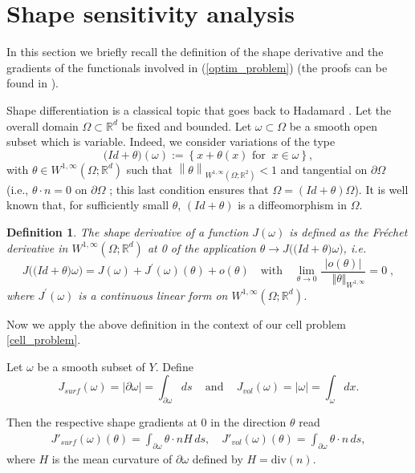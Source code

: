 \documentclass{article}
\newtheorem{defn}[thm]{Definition}
\def\RR{{\mathbb{R}}}
\begin{document}
\section{Shape sensitivity analysis}
\label{shape_deriv_fuel_cell}

In this section we briefly recall the definition of the shape derivative and  
the gradients of the functionals involved in (\ref{optim_problem}) (the proofs can be found in \cite{schmidt2010shape}).

Shape differentiation is a classical topic that goes back to Hadamard \cite{allaire2006conception,pierre,intro_sokolowski}. 
Let the overall domain $\Omega\subset \mathbb{R}^d$ be fixed and bounded. 
Let $\omega \subset \Omega$ be a smooth open subset which is variable. Indeed, 
we consider variations of the type
$$
\big( Id + \theta \big) (\omega) := \left\{ x + \theta(x) 
\mbox{ for } \ x \in \omega\right\} ,
$$
with $\theta\in W^{1,\infty}(\Omega;\RR^d)$ such that
$\left\|\theta\right\|_{W^{1,\infty}(\Omega;\RR^2)}<1$ and tangential on $\partial \Omega$ 
(i.e., $\theta\cdot n=0$ on $\partial \Omega$ ; this last
condition ensures that $\Omega=( Id + \theta)\Omega$).
It is well known that, for sufficiently small $\theta$,
$(Id + \theta)$ is a diffeomorphism in $\Omega$.

\begin{defn}
\label{defshape}
The shape derivative of a function $J(\omega)$ is
defined as the Fr\'echet derivative in $W^{1,\infty}(\Omega;\RR^d)$
at 0 of the application $\theta \to J\big( \big( Id + \theta \big) \omega \big)$,
i.e.
$$
J\big( \big( Id + \theta \big) \omega \big)  = J (\omega)
+ J^\prime(\omega)(\theta) + o(\theta) \quad\mbox{with}\quad
\lim_{\theta\to 0} \frac{|o(\theta)|}{\quad \Vert\theta\Vert_{W^{1,\infty}}}=0\;,
$$
where $J^\prime(\omega)$ is a continuous linear form on $W^{1,\infty}(\Omega;\RR^d)$.\\
\end{defn}

Now we apply the above definition in the context of our cell problem \eqref{cell_problem}.

{
\lem
Let $\omega$ be a smooth subset of $Y$. Define
\begin{equation*}
J_{surf}(\omega)=|\partial \omega|=\int_{\partial \omega} ds \;\;\;\mbox{   and  }\;\;\; J_{vol}(\omega)=|\omega|=\int_{\omega} dx.
\end{equation*}

Then the respective shape gradients at $0$ in the direction $\theta$ read
\begin{eqnarray*}
J'_{surf}(\omega)(\theta)=\int_{\partial \omega} \theta \cdot n H\,ds,\quad 
J'_{vol}(\omega)(\theta)=\int_{\partial \omega} \theta \cdot n\, ds,
\end{eqnarray*}
where $H$ is the mean curvature of $\partial \omega$ defined by $H=\mbox{div}(n)$.\\
}
\end{document}
